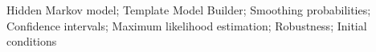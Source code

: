 \documentclass[]{interact}\usepackage[]{graphicx}\usepackage[dvipsnames]{xcolor}
\theoremstyle{plain}%
\theoremstyle{definition}
\theoremstyle{remark}
\begin{document}
\begin{abstract}
\end{abstract}



\begin{keywords}
Hidden Markov model; Template Model Builder; Smoothing probabilities; Confidence intervals; Maximum likelihood estimation; Robustness; Initial conditions
\end{keywords}
\end{document}
